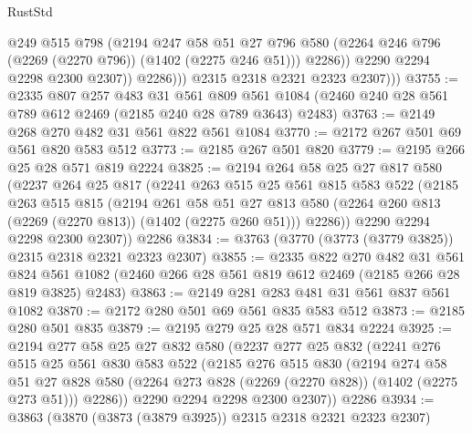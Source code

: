 \begin{lexlean}{RustStd}
\begin{coremodule}
                      @249
                      @515
                      @798
                      (@2194
                        @247
                        @58
                        @51
                        @27
                        @796
                        @580
                        (@2264 @246 @796 (@2269 (@2270 @796)) (@1402 (@2275 @246 @51)))
                        @2286))
                    @2290
                    @2294
                    @2298
                    @2300
                    @2307))
                @2286)))
          @2315
          @2318
          @2321
          @2323
          @2307)))
@3755 := @2335
    @807
    @257
    @483
    @31
    @561
    @809
    @561
    @1084
    (@2460 @240 @28 @561 @789 @612 @2469 (@2185 @240 @28 @789 @3643) @2483)
@3763 := @2149 @268 @270 @482 @31 @561 @822 @561 @1084
@3770 := @2172 @267 @501 @69 @561 @820 @583 @512
@3773 := @2185 @267 @501 @820
@3779 := @2195 @266 @25 @28 @571 @819 @2224
@3825 := @2194
    @264
    @58
    @25
    @27
    @817
    @580
    (@2237
      @264
      @25
      @817
      (@2241
        @263
        @515
        @25
        @561
        @815
        @583
        @522
        (@2185
          @263
          @515
          @815
          (@2194
            @261
            @58
            @51
            @27
            @813
            @580
            (@2264 @260 @813 (@2269 (@2270 @813)) (@1402 (@2275 @260 @51)))
            @2286))
        @2290
        @2294
        @2298
        @2300
        @2307))
    @2286
@3834 := @3763 (@3770 (@3773 (@3779 @3825)) @2315 @2318 @2321 @2323 @2307)
@3855 := @2335
    @822
    @270
    @482
    @31
    @561
    @824
    @561
    @1082
    (@2460 @266 @28 @561 @819 @612 @2469 (@2185 @266 @28 @819 @3825) @2483)
@3863 := @2149 @281 @283 @481 @31 @561 @837 @561 @1082
@3870 := @2172 @280 @501 @69 @561 @835 @583 @512
@3873 := @2185 @280 @501 @835
@3879 := @2195 @279 @25 @28 @571 @834 @2224
@3925 := @2194
    @277
    @58
    @25
    @27
    @832
    @580
    (@2237
      @277
      @25
      @832
      (@2241
        @276
        @515
        @25
        @561
        @830
        @583
        @522
        (@2185
          @276
          @515
          @830
          (@2194
            @274
            @58
            @51
            @27
            @828
            @580
            (@2264 @273 @828 (@2269 (@2270 @828)) (@1402 (@2275 @273 @51)))
            @2286))
        @2290
        @2294
        @2298
        @2300
        @2307))
    @2286
@3934 := @3863 (@3870 (@3873 (@3879 @3925)) @2315 @2318 @2321 @2323 @2307)

\end{coremodule}
\end{lexlean}
